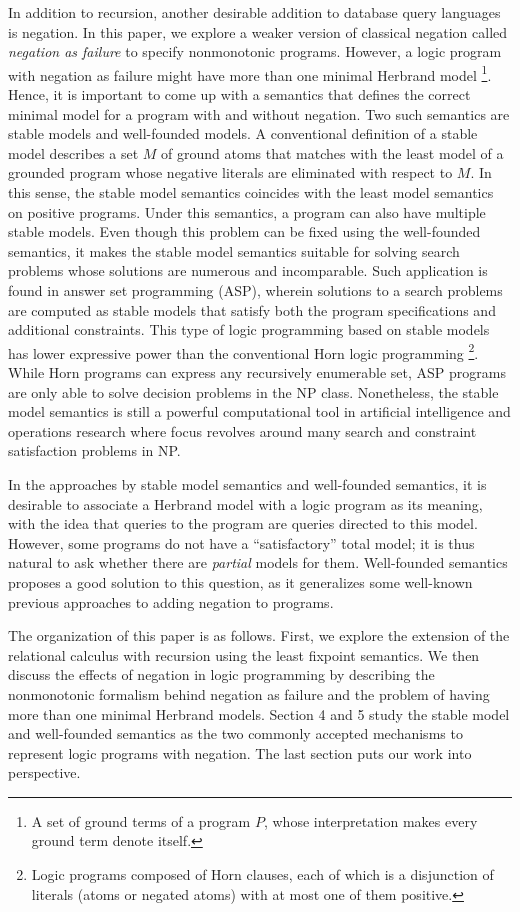 In addition to recursion, another desirable addition to database query languages 
is negation. In this paper, we explore a weaker version of classical negation called 
\emph{negation as failure} to specify nonmonotonic programs. However, a logic 
program with negation as failure might have more than one minimal Herbrand model 
\footnote{A set of ground terms of a program $P$, whose interpretation 
makes every ground term denote itself.}. Hence, it is important 
to come up with a semantics that defines the correct minimal 
model for a program with and without negation. Two such semantics 
are stable models and well-founded models. A conventional 
definition of a stable model
describes a set $M$ of ground atoms that matches with the least model 
of a grounded program whose negative literals are eliminated with respect to 
$M$. In this sense, the stable model semantics coincides with 
the least model semantics on positive programs. Under this 
semantics, a program can also have multiple stable models. Even though 
this problem can be fixed using the well-founded semantics, 
it makes the stable model semantics suitable for solving search 
problems whose solutions are numerous and incomparable. Such 
application is found in answer set programming (ASP), wherein 
solutions to a search problems are computed as stable models 
that satisfy both the program specifications and additional constraints. 
This type of logic programming based on stable models has lower 
expressive power than the conventional Horn logic programming 
\footnote{Logic programs composed of Horn clauses, 
each of which is a disjunction of literals (atoms or negated atoms) with at most one of 
them positive.}. While Horn programs can express any recursively enumerable set, 
ASP programs are only able to solve decision problems in the NP class. 
Nonetheless, the stable model semantics is still 
a powerful computational tool in artificial 
intelligence and operations research where focus 
revolves around many search and constraint satisfaction 
problems in NP.

In the approaches by stable model semantics and well-founded semantics, it is desirable to associate a Herbrand model with a logic program as its meaning, with the idea that queries to the program are queries directed to this model. However, some programs do not have a ``satisfactory'' total model; it is thus natural to ask whether there are \emph{partial} models for them. Well-founded semantics proposes a good solution to this question, as it generalizes some well-known previous approaches to adding negation to programs.

The organization of this paper is as follows. First, we 
explore the extension of the relational calculus with recursion 
using the least fixpoint semantics. We then discuss the effects 
of negation in logic programming by describing the nonmonotonic 
formalism behind negation as failure and the problem of 
having more than one minimal Herbrand models. Section 4 and 5 
study the stable model and well-founded semantics as the two 
commonly accepted mechanisms to represent logic programs with 
negation. The last section puts our work into perspective.